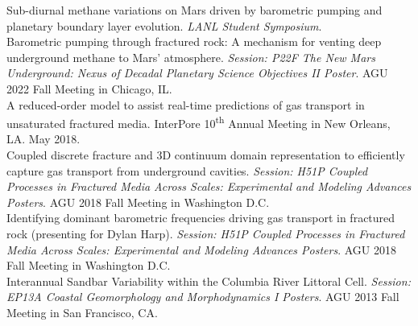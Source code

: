\documentclass[11pt, letterpaper]{article}
\newcommand{\years}[1]{\marginnote{\scriptsize #1}}
\begin{document}
Sub-diurnal methane variations on Mars driven by barometric pumping and
planetary boundary layer evolution. \textit{LANL Student Symposium}.\\
%
\years{2022}
Barometric pumping through fractured rock: A
mechanism for venting deep underground methane to Mars' atmosphere.
\textit{Session: P22F The New Mars Underground: Nexus of Decadal Planetary
Science Objectives II Poster}. AGU 2022 Fall Meeting in Chicago, IL.
\AGUFallMeetingAbstraOOOOBarometricPumpingThr\\ 
%
\years{2018}
A reduced-order model to assist real-time predictions of gas transport in
unsaturated fractured media. InterPore 10\textsuperscript{th} Annual Meeting in
New Orleans, LA. May 2018.\\
%
\years{2018}
Coupled discrete fracture and 3D continuum domain representation
to efficiently capture gas transport from underground cavities.
\textit{Session: H51P Coupled Processes in Fractured Media Across Scales:
Experimental and Modeling Advances Posters}. AGU 2018 Fall Meeting in
Washington D.C. \\
%
\years{2018}
Identifying dominant barometric
frequencies driving gas transport in fractured rock (presenting for Dylan
Harp). \textit{Session: H51P Coupled Processes in Fractured Media Across
Scales: Experimental and Modeling Advances Posters}. AGU 2018 Fall Meeting in
Washington D.C. 
\AGUFallMeetingOOOOIdentifyingdominantb\\
%
\years{2013}
Interannual Sandbar Variability within the Columbia River Littoral Cell.
\textit{Session: EP13A Coastal Geomorphology and Morphodynamics I Posters}.
AGU 2013 Fall Meeting in San Francisco, CA.
\end{document}
